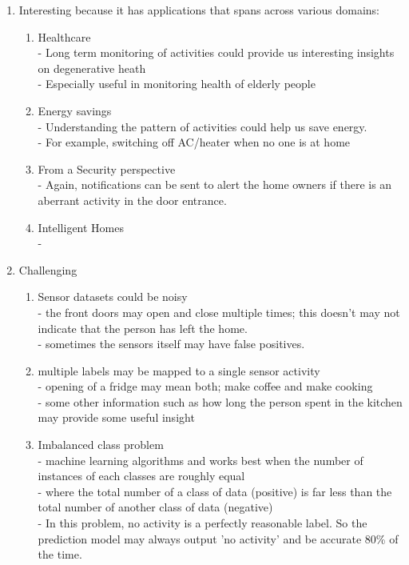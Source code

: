 \documentclass[11pt, oneside]{article}   	%
\begin{document}
\begin{enumerate}
 
\item Interesting because it has applications that spans across various domains:
	\begin{enumerate}
	\item Healthcare\\
		- Long term monitoring of activities could provide us interesting insights on degenerative heath \\
		- Especially useful in monitoring health of elderly people\\
	\item  Energy savings \\
		- Understanding the pattern of activities could help us save energy. \\
		- For example, switching off AC/heater when no one is at home \\
	\item  From a Security perspective\\
		- Again, notifications can be sent to alert the home owners if there is an aberrant activity in the door entrance. \\
	\item  Intelligent Homes\\
		- 
	\end{enumerate}
\item Challenging
		\begin{enumerate}
	\item Sensor datasets could be noisy\\
		- the front doors may open and close multiple times; this doesn't may not indicate that the person has left the home.\\
		- sometimes the sensors itself may have false positives. \\
		
	\item multiple labels may be mapped to a single sensor activity\\
		- opening of a fridge may mean both; make coffee and make cooking\\
		- some other information such as how long the person spent in the kitchen may provide some useful insight\\
		
	\item Imbalanced class problem\\
		- machine learning algorithms and works best when the number of instances of each classes are roughly equal\\
		- where the total number of a class of data (positive) is far less than the total number of another class of data (negative)	\\
		- In this problem, no activity is a perfectly reasonable label. So the prediction model may always output 'no activity' and be accurate 80\% of the time.\\
		\end{enumerate}

\end{enumerate}
\end{document}
